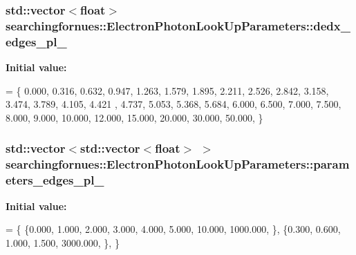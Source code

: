 \subsubsection[{\texorpdfstring{dedx\+\_\+edges\+\_\+pl\+\_\+2}{dedx_edges_pl_2}}]{\setlength{\rightskip}{0pt plus 5cm}std\+::vector$<$float$>$ searchingfornues\+::\+Electron\+Photon\+Look\+Up\+Parameters\+::dedx\+\_\+edges\+\_\+pl\+\_}\hypertarget{structsearchingfornues_1_1ElectronPhotonLookUpParameters_afc5db4e03400bb22190656143cab1697}{}\label{structsearchingfornues_1_1ElectronPhotonLookUpParameters_afc5db4e03400bb22190656143cab1697}
{\bfseries Initial value\+:}
\begin{DoxyCode}
= \{
    0.000, 0.316, 0.632, 0.947, 1.263, 1.579, 1.895, 2.211, 2.526, 2.842, 3.158, 3.474, 3.789, 4.105, 4.421
      , 4.737, 5.053, 5.368, 5.684, 6.000,
    6.500, 7.000, 7.500, 8.000, 9.000, 10.000, 12.000, 15.000, 20.000, 30.000, 50.000,
    \}
\end{DoxyCode}
\subsubsection[{\texorpdfstring{parameters\+\_\+edges\+\_\+pl\+\_\+0}{parameters_edges_pl_0}}]{\setlength{\rightskip}{0pt plus 5cm}std\+::vector$<$std\+::vector$<$float$>$ $>$ searchingfornues\+::\+Electron\+Photon\+Look\+Up\+Parameters\+::parameters\+\_\+edges\+\_\+pl\+\_}\hypertarget{structsearchingfornues_1_1ElectronPhotonLookUpParameters_a6adfc4806f3ee5689cbc927859224bce}{}\label{structsearchingfornues_1_1ElectronPhotonLookUpParameters_a6adfc4806f3ee5689cbc927859224bce}
{\bfseries Initial value\+:}
\begin{DoxyCode}
= \{
    \{0.000, 1.000, 2.000, 3.000, 4.000, 5.000, 10.000, 1000.000, \},
    \{0.300, 0.600, 1.000, 1.500, 3000.000, \},
    \}
\end{DoxyCode}

